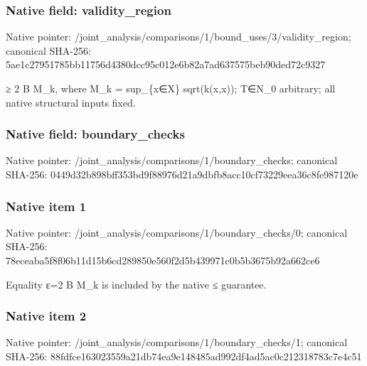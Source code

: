 \documentclass[10pt,a4paper]{article}
\begin{document}
\subsubsection{Native field: validity\_\allowbreak{}region}
Native pointer: /joint\_\allowbreak{}analysis/comparisons/1/bound\_\allowbreak{}uses/3/validity\_\allowbreak{}region; canonical SHA-256: 5ae1c27951785bb11756d4380dcc95c012e6b82a7ad637575beb90ded72c9327

\begingroup\raggedright{}\allowbreak{} {\AtlasUnicodeSymbols ≥}\allowbreak{} 2 B M\_\allowbreak{}k,\allowbreak{} where M\_\allowbreak{}k =\allowbreak{} sup\_\allowbreak{}\{x{\AtlasUnicodeSymbols ∈}\allowbreak{}X\} sqrt(k(x,\allowbreak{}x));\allowbreak{} T{\AtlasUnicodeSymbols ∈}\allowbreak{}N\_\allowbreak{}0 arbitrary;\allowbreak{} all native structural inputs fixed.\par\endgroup

\subsubsection{Native field: boundary\_\allowbreak{}checks}
Native pointer: /joint\_\allowbreak{}analysis/comparisons/1/boundary\_\allowbreak{}checks; canonical SHA-256: 0449d32b898bff353bd9f88976d21a9dbfb8acc10cf73229eea36c8fe987120e

\subsubsection{Native item 1}
Native pointer: /joint\_\allowbreak{}analysis/comparisons/1/boundary\_\allowbreak{}checks/0; canonical SHA-256: 78eceaba5f8f06b11d15b6cd289850e560f2d5b439971c0b5b3675b92a662ce6

\begingroup\raggedright\sloppy Equality {\AtlasUnicodeText ε}\allowbreak{}=\allowbreak{}2 B M\_\allowbreak{}k is included by the native {\AtlasUnicodeSymbols ≤}\allowbreak{} guarantee.\par\endgroup

\subsubsection{Native item 2}
Native pointer: /joint\_\allowbreak{}analysis/comparisons/1/boundary\_\allowbreak{}checks/1; canonical SHA-256: 88fdfce163023559a21db74ea9e148485ad992df4ad5ac0c212318783c7e4c51
\end{document}
